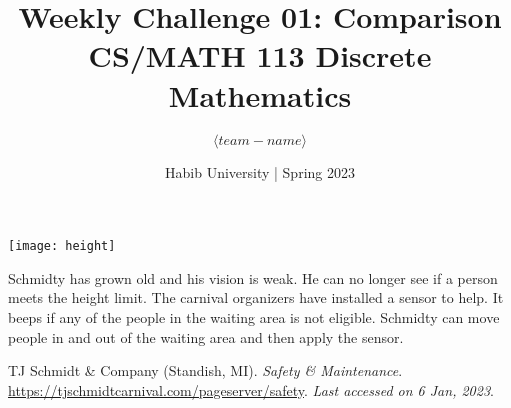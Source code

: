 \documentclass[a4paper]{exam}
\title{Weekly Challenge 01: Comparison\\CS/MATH 113 Discrete Mathematics}
\author{$\langle team-name \rangle$}  %
\date{Habib University | Spring 2023}
\begin{document}
\maketitle

\begin{questions}
  
  \begin{minipage}{.3\linewidth}
  \centerline{\texttt{[image: height]}}
\end{minipage}
  \begin{minipage}{.65\linewidth}
Schmidty \cite{schmidt} has grown old and his vision is weak. He can no longer see if a person meets the height limit. The carnival organizers have installed a sensor to help. It beeps if any of the people in the waiting area is not eligible. Schmidty can move people in and out of the waiting area and then apply the sensor.

\end{minipage}
\begin{solution}
  \end{solution}
\end{questions}

\begin{thebibliography}{9}
  TJ Schmidt \& Company (Standish, MI). \emph{Safety \& Maintenance}. \url{https://tjschmidtcarnival.com/pageserver/safety}. \textit{Last accessed on 6 Jan, 2023}.
\end{thebibliography}
\end{document}
